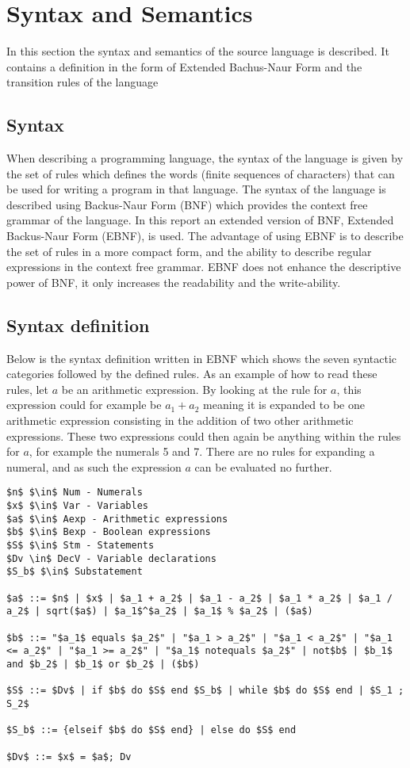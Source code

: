 \chapter{Syntax and Semantics}\label{analysis:syntax-and-semantics}
In this section the syntax and semantics of the source language is described. It contains a definition in the form of Extended Bachus-Naur Form and the transition rules of the language

\section{Syntax}
When describing a programming language, the syntax of the language is given by the set of rules which defines the words (finite sequences of characters) that can be used for writing a program in that language. The syntax of the language is described using Backus-Naur Form (BNF) which provides the context free grammar of the language.
In this report an extended version of BNF, Extended Backus-Naur Form (EBNF), is used. The advantage of using EBNF is to describe the set of rules in a more compact form, and the ability to describe regular expressions in the context free grammar. EBNF does not enhance the descriptive power of BNF, it only increases the readability and the write-ability.

\section{Syntax definition}\label{sec:anlysis:syntax-definition}
Below is the syntax definition written in EBNF which shows the seven syntactic categories followed by the defined rules. As an example of how to read these rules, let $a$ be an arithmetic expression. By looking at the rule for $a$, this expression could for example be $a_1 + a_2$ meaning it is expanded to be one arithmetic expression consisting in the addition of two other arithmetic expressions. These two expressions could then again be anything within the rules for $a$, for example the numerals 5 and 7. There are no rules for expanding a numeral, and as such the expression $a$ can be evaluated no further.
\begin{lstlisting}[mathescape, captionpos=b, caption={Syntax formation rules}, label={lst:syntax-formation}]
$n$ $\in$ Num - Numerals
$x$ $\in$ Var - Variables
$a$ $\in$ Aexp - Arithmetic expressions
$b$ $\in$ Bexp - Boolean expressions
$S$ $\in$ Stm - Statements
$Dv \in$ DecV - Variable declarations
$S_b$ $\in$ Substatement

$a$ ::= $n$ | $x$ | $a_1 + a_2$ | $a_1 - a_2$ | $a_1 * a_2$ | $a_1 / a_2$ | sqrt($a$) | $a_1$^$a_2$ | $a_1$ % $a_2$ | ($a$)

$b$ ::= "$a_1$ equals $a_2$" | "$a_1 > a_2$" | "$a_1 < a_2$" | "$a_1 <= a_2$" | "$a_1 >= a_2$" | "$a_1$ notequals $a_2$" | not$b$ | $b_1$ and $b_2$ | $b_1$ or $b_2$ | ($b$)

$S$ ::= $Dv$ | if $b$ do $S$ end $S_b$ | while $b$ do $S$ end | $S_1 ; S_2$

$S_b$ ::= {elseif $b$ do $S$ end} | else do $S$ end

$Dv$ ::= $x$ = $a$; Dv
\end{lstlisting}

